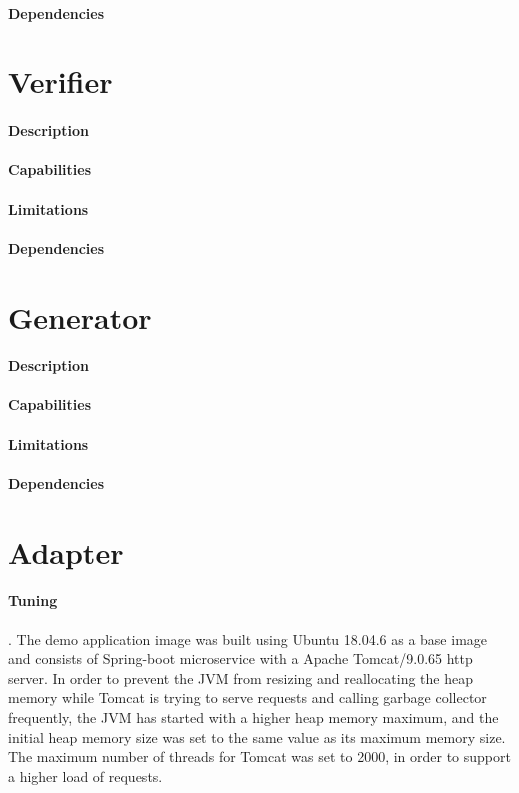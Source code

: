 \paragraph{Dependencies}

\section{Verifier} %
\label{sec:verifier}

\paragraph{Description}
\paragraph{Capabilities}
\paragraph{Limitations}
\paragraph{Dependencies}

\section{Generator} %
\label{sec:generator}

\paragraph{Description}
\paragraph{Capabilities}
\paragraph{Limitations}
\paragraph{Dependencies}

\section{Adapter} %
\label{sec:adapter}

\paragraph{Tuning}. The demo application image was built using Ubuntu 18.04.6 as a base image and consists of Spring-boot microservice with a Apache Tomcat/9.0.65 http server.
In order to prevent the JVM from resizing and reallocating the heap memory while Tomcat is trying to serve requests and
calling garbage collector frequently, the JVM has started with a higher heap memory maximum, and the initial heap memory
size was set to the same value as its maximum memory size.
The maximum number of threads for Tomcat was set to 2000, in order to support a higher load of requests.

